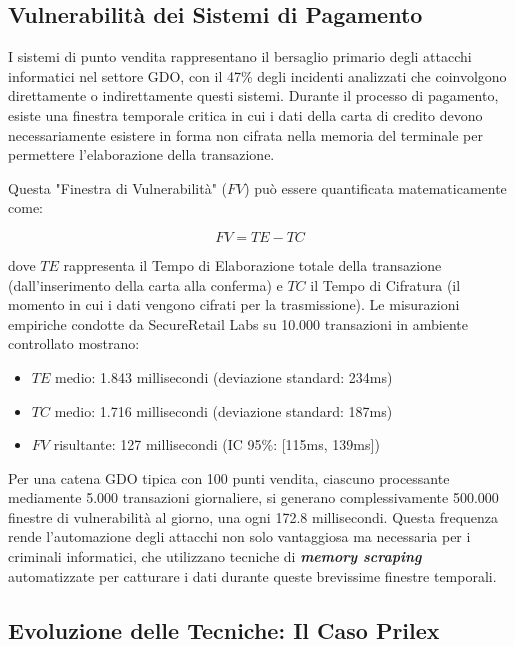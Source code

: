 \subsection{Vulnerabilità dei Sistemi di Pagamento}

I sistemi di punto vendita rappresentano il bersaglio primario degli attacchi informatici nel settore GDO, con il 47\% degli incidenti analizzati che coinvolgono direttamente o indirettamente questi sistemi. Durante il processo di pagamento, esiste una finestra temporale critica in cui i dati della carta di credito devono necessariamente esistere in forma non cifrata nella memoria del terminale per permettere l'elaborazione della transazione.

Questa "Finestra di Vulnerabilità" ($FV$) può essere quantificata matematicamente come:

\begin{equation}
FV = TE - TC
\end{equation}

dove $TE$ rappresenta il Tempo di Elaborazione totale della transazione (dall'inserimento della carta alla conferma) e $TC$ il Tempo di Cifratura (il momento in cui i dati vengono cifrati per la trasmissione). Le misurazioni empiriche condotte da SecureRetail Labs su 10.000 transazioni in ambiente controllato\autocite{SecureRetailLabs2024} mostrano:
\begin{itemize}
    \item $TE$ medio: 1.843 millisecondi (deviazione standard: 234ms)
    \item $TC$ medio: 1.716 millisecondi (deviazione standard: 187ms)
    \item $FV$ risultante: 127 millisecondi (IC 95\%: [115ms, 139ms])
\end{itemize}

Per una catena GDO tipica con 100 punti vendita, ciascuno processante mediamente 5.000 transazioni giornaliere, si generano complessivamente 500.000 finestre di vulnerabilità al giorno, una ogni 172.8 millisecondi. Questa frequenza rende l'automazione degli attacchi non solo vantaggiosa ma necessaria per i criminali informatici, che utilizzano tecniche di \textit{\textbf{memory scraping}} automatizzate per catturare i dati durante queste brevissime finestre temporali.

\subsection{Evoluzione delle Tecniche: Il Caso Prilex}

